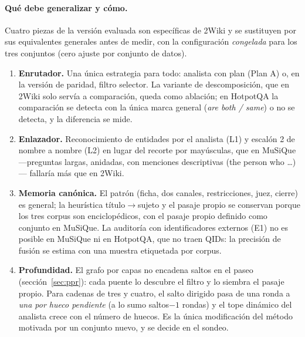 \documentclass[11pt,a4paper]{article}
\begin{document}
\paragraph{Qué debe generalizar y cómo.}
Cuatro piezas de la versión evaluada son específicas de 2Wiki y se
sustituyen por sus equivalentes generales antes de medir, con la
configuración \emph{congelada} para los tres conjuntos (cero ajuste por
conjunto de datos).
\begin{enumerate}[leftmargin=1.6em, itemsep=2pt]
\item \textbf{Enrutador.} Una única estrategia para todo: analista con
  plan (Plan A) o, en la versión de paridad, filtro selector. La variante
  de descomposición, que en 2Wiki solo servía a comparación, queda como
  ablación; en HotpotQA la comparación se detecta con la única marca
  general (\emph{are both / same}) o no se detecta, y la diferencia se
  mide.
\item \textbf{Enlazador.} Reconocimiento de entidades por el analista
  (L1) y escalón 2 de nombre a nombre (L2) en lugar del recorte por
  mayúsculas, que en MuSiQue ---preguntas largas, anidadas, con
  menciones descriptivas (\guillemotleft{}the person who \dots\guillemotright{})--- fallaría más
  que en 2Wiki.
\item \textbf{Memoria canónica.} El patrón (ficha, dos canales,
  restricciones, juez, cierre) es general; la heurística
  título$\to$sujeto y el pasaje propio se conservan porque los tres
  corpus son enciclopédicos, con el pasaje propio definido como conjunto
  en MuSiQue. La auditoría con identificadores externos (E1) no es
  posible en MuSiQue ni en HotpotQA, que no traen QIDs: la precisión de
  fusión se estima con una muestra etiquetada por corpus.
\item \textbf{Profundidad.} El grafo por capas no encadena saltos en el
  paseo (sección~\ref{sec:ppr}): cada puente lo descubre el filtro y lo
  siembra el pasaje propio. Para cadenas de tres y cuatro, el salto
  dirigido pasa de una ronda a \emph{una por hueco pendiente} (a lo sumo
  saltos$-1$ rondas) y el tope dinámico del analista crece con el número
  de huecos. Es la única modificación del método motivada por un
  conjunto nuevo, y se decide en el sondeo.
\end{enumerate}
\end{document}
